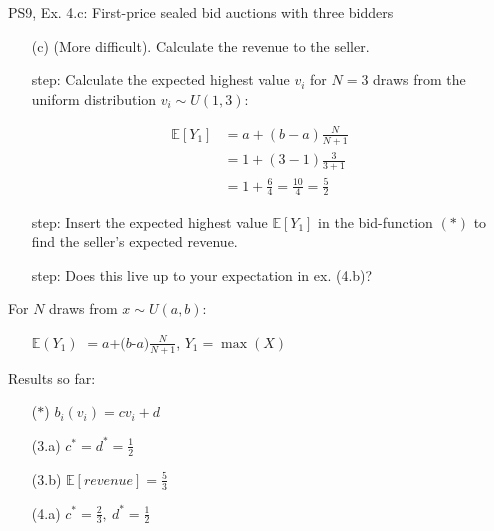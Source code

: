 \begin{frame}{PS9, Ex. 4.c: First-price sealed bid auctions with three bidders}
    \begin{itemize}
      \item[(c)] (More difficult). Calculate the revenue to the seller.
    \end{itemize}
    \vspace{-10pt}
    \begin{multicols}{2}
      \begin{itemize}
        \item[\nth{1} step:] Calculate the expected highest value $v_i$ for $N=3$ draws from the uniform distribution $v_i\sim U(1,3)$:
      \end{itemize}
      \vspace{-8pt}
      \begin{align*}
        \mathbb{E}[Y_1]&=a+(b-a)\frac{N}{N+1}\\
                       &=1+(3-1)\frac{3}{3+1}\\
                       &=1+\frac{6}{4}=\frac{10}{4}=\frac{5}{2}
      \end{align*}
      \vspace{-12pt}
      \begin{itemize}
        \item[\nth{2} step:] Insert the expected highest value $\mathbb{E}[Y_1]$ in the bid-function $(*)$  to find the seller's expected revenue.
        \item[\nth{3} step:] Does this live up to your expectation in ex. (4.b)?
      \end{itemize}
      \vfill\null\columnbreak
      For $N$ draws from $x\sim U(a, b):$
      \vspace{-6pt}
      \begin{enumerate}
        \item[$\mathbb{E}(Y_1)$] $=a$+$(b$-$a)\frac{N}{N+1}$, $Y_1=\max(X)$
      \end{enumerate}
      \vspace{-6pt}
      Results so far:
      \vspace{-6pt}
      \begin{itemize}
        \item[($*$)] $b_i(v_i) = cv_i+d$
        \item[(3.a)] $c^*=d^*=\frac{1}{2}$
        \item[(3.b)] $\mathbb{E}[revenue]=\frac{5}{3}$
        \item[(4.a)] $c^*=\frac{2}{3},\ d^*=\frac{1}{2}$

\end{itemize}
\end{multicols}
\end{frame}
